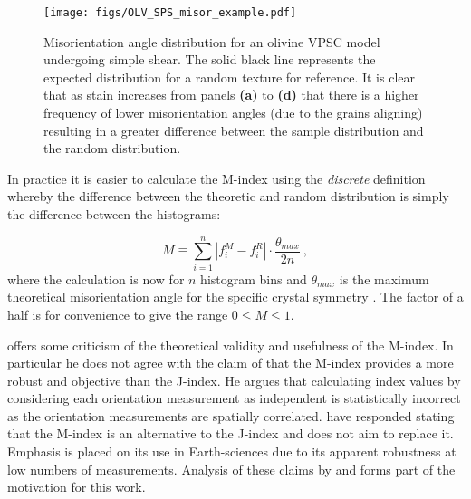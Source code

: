 \documentclass[a4paper,12pt,twoside]{report}
\numberwithin{equation}{chapter}
\begin{document}
\begin{figure}[t]
  \centering
    \texttt{[image: figs/OLV\_SPS\_misor\_example.pdf]}
  \caption[Misorientation angle distribution example (olivine VPSC)]{Misorientation angle distribution for an olivine VPSC model undergoing simple shear. The solid black line represents the expected distribution for a random texture for reference. It is clear that as stain increases from panels \textbf{(a)} to \textbf{(d)} that there is a higher frequency of lower misorientation angles (due to the grains aligning) resulting in a greater difference between the sample distribution and the random distribution.}
  \label{fig:misorientation_example}
\end{figure}

In practice it is easier to calculate the M-index using the \emph{discrete} definition whereby the difference between the theoretic and random distribution is simply the difference between the histograms:

\begin{equation} \label{eq:Mindex_disc}
M \equiv \sum_{i=1}^n | f_i^M - f_i^R | \cdot \frac{\theta_{max}}{2n}\ ,
\end{equation} 
where the calculation is now for $n$ histogram bins and $\theta_{max}$ is the maximum theoretical misorientation angle for the specific crystal symmetry \citep[for discussion on misorientation angle distirbutions for various crystal symmetries see][and references therein]{Grimmer1979,Wheeler2001}. The factor of a half is for convenience to give the range $0 \leq M \leq 1$. 

  

\cite{Schaeben2007} offers some criticism of the theoretical validity and usefulness of the M-index. In particular he does not agree with the claim of \cite{Skemer} that the M-index provides a more robust and objective than the J-index. He argues that calculating index values by considering each orientation measurement as independent is statistically incorrect as the orientation measurements are spatially correlated. \cite{Skemer2007reply} have responded stating that the M-index is an alternative to the J-index and does not aim to replace it. Emphasis is placed on its use in Earth-sciences due to its apparent robustness at low numbers of measurements. Analysis of these claims by \cite{Skemer} and \cite{Skemer2007reply} forms part of the motivation for this work.  
\end{document}
